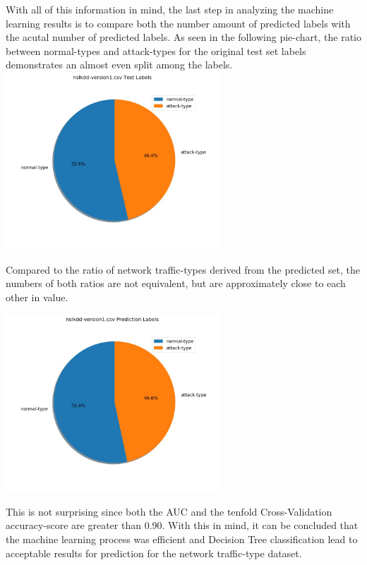\documentclass[a4paper,12pt]{IEEEtran}
\begin{document}
With all of this information in mind, the last step in analyzing the machine learning results is to compare both the number amount of predicted labels with the acutal number of predicted labels. As seen in the following pie-chart, the ratio between normal-types and attack-types for the original test set labels demonstrates an almost even split among the labels.
\includegraphics[width=8cm]{v1_test_pie}

Compared to the ratio of network traffic-types derived from the predicted set, the numbers of both ratios are not equivalent, but are approximately close to each other in value.

\includegraphics[width=8cm]{v1_pred_pie}

This is not surprising since both the AUC and the tenfold Cross-Validation accuracy-score are greater than 0.90. With this in mind, it can be concluded that the machine learning process was efficient and Decision Tree classification lead to acceptable results for prediction for the network traffic-type dataset.
\end{document}
